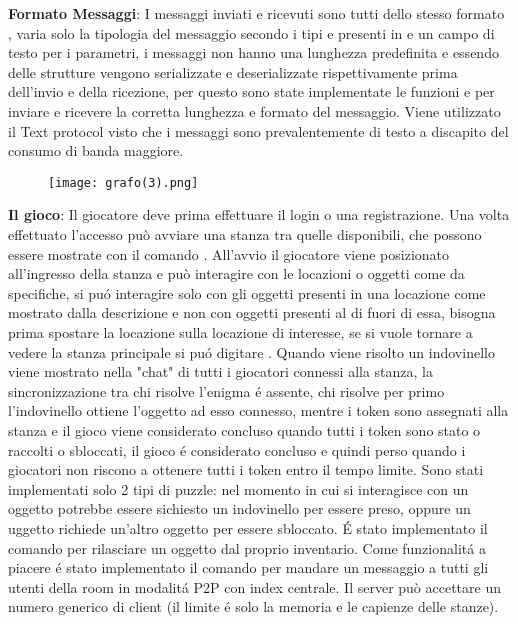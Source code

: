 \documentclass[12pt]{article}
\begin{document}
\vspace{0.1in}

\textbf{Formato Messaggi}: I messaggi inviati e ricevuti sono tutti dello stesso formato , varia solo la tipologia del messaggio secondo i tipi  e  presenti in  e un campo di testo per i parametri, i messaggi non hanno una lunghezza predefinita e essendo delle strutture vengono serializzate e deserializzate rispettivamente prima dell'invio e della ricezione, per questo sono state implementate le funzioni  e  per inviare e ricevere la corretta lunghezza e formato del messaggio. Viene utilizzato il Text protocol visto che i messaggi sono prevalentemente di testo a discapito del consumo di banda maggiore.

\vspace{0.1in}

\begin{figure}[h]
    \centering
    \texttt{[image: grafo(3).png]}
\end{figure}

\textbf{Il gioco}: Il giocatore deve prima effettuare il login o una registrazione. Una volta effettuato l'accesso può avviare una stanza tra quelle disponibili, che possono essere mostrate con il comando . All'avvio il giocatore viene posizionato all'ingresso della stanza e può interagire con le locazioni o oggetti come da specifiche, si puó interagire solo con gli oggetti presenti in una locazione come mostrato dalla descrizione e non con oggetti presenti al di fuori di essa, bisogna prima spostare la locazione sulla locazione di interesse, se si vuole tornare a vedere la stanza principale si puó digitare . Quando viene risolto un indovinello viene mostrato nella "chat" di tutti i giocatori connessi alla stanza, la sincronizzazione tra chi risolve l'enigma é assente, chi risolve per primo l'indovinello ottiene l'oggetto ad esso connesso, mentre i token sono assegnati alla stanza e il gioco viene considerato concluso quando tutti i token sono stato o raccolti o sbloccati, il gioco é considerato concluso e quindi perso quando i giocatori non riscono a ottenere tutti i token entro il tempo limite. Sono stati implementati solo 2 tipi di puzzle: nel momento in cui si interagisce con un oggetto potrebbe essere sichiesto un indovinello per essere preso, oppure un uggetto richiede un'altro oggetto per essere sbloccato. É stato implementato il comando  per rilasciare un oggetto dal proprio inventario. Come funzionalitá a piacere é stato implementato il comando  per mandare un messaggio a tutti gli utenti della room in modalitá P2P con index centrale. Il server può accettare un numero generico di client (il limite é solo la memoria e le capienze delle stanze).
\end{document}
